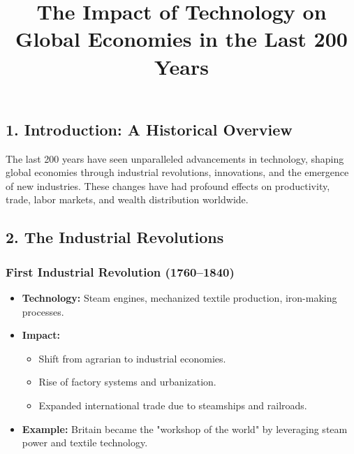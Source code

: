 \documentclass{article}
\title{The Impact of Technology on Global Economies in the Last 200 Years}
\author{}
\date{}
\begin{document}
\maketitle
\section*{}

\subsection*{1. Introduction: A Historical Overview}
The last 200 years have seen unparalleled advancements in technology, shaping global economies through industrial revolutions, innovations, and the emergence of new industries. These changes have had profound effects on productivity, trade, labor markets, and wealth distribution worldwide.

\subsection*{2. The Industrial Revolutions}
\subsubsection*{First Industrial Revolution (1760–1840)}
\begin{itemize}
    \item \textbf{Technology:} Steam engines, mechanized textile production, iron-making processes.
    \item \textbf{Impact:}
    \begin{itemize}
        \item Shift from agrarian to industrial economies.
        \item Rise of factory systems and urbanization.
        \item Expanded international trade due to steamships and railroads.
    \end{itemize}
    \item \textbf{Example:} Britain became the "workshop of the world" by leveraging steam power and textile technology.
\end{itemize}
\end{document}
